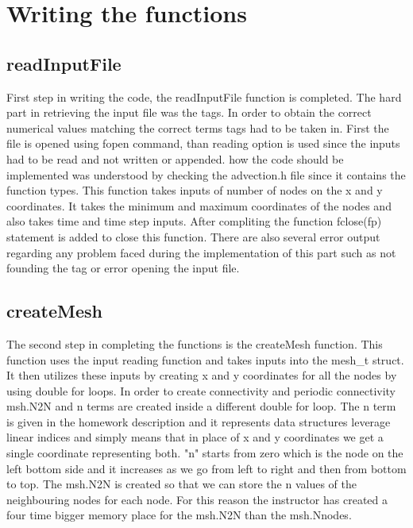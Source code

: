 \documentclass{article}
\begin{document}
\section{Writing the functions}

\subsection{readInputFile}

First step in writing the code, the readInputFile function is completed. The hard part in retrieving the input file was the tags. In order to obtain the correct numerical values matching the correct terms tags had to be taken in. First the file is opened using fopen command, than reading option is used since the inputs had to be read and not written or appended. how the code should be implemented was understood by checking the advection.h file since it contains the function types. 
This function takes inputs of number of nodes on the x and y coordinates. It takes the minimum and maximum coordinates of the nodes and also takes time and time step inputs.
After compliting the function fclose(fp) statement is added to close this function. There are also several error output regarding any problem faced during the implementation of this part such as not founding the tag or error opening the input file.

\subsection{createMesh}

The second step in completing the functions is the createMesh function. This function uses the input reading function and takes inputs into the mesh\_t struct. It then utilizes these inputs by creating x and y coordinates for all the nodes by using double for loops. In order to create connectivity and periodic connectivity msh.N2N and n terms are created inside a different double for loop. The n term is given in the homework description and it represents data structures leverage linear indices and simply means that in place of x and y coordinates we get a single coordinate representing both. "n" starts from zero which is the node on the left bottom side and it increases as we go from left to right and then from bottom to top. The msh.N2N is created so that we can store the n values of the neighbouring nodes for each node. For this reason the instructor has created a four time bigger memory place for the msh.N2N than the msh.Nnodes. 
\end{document}
